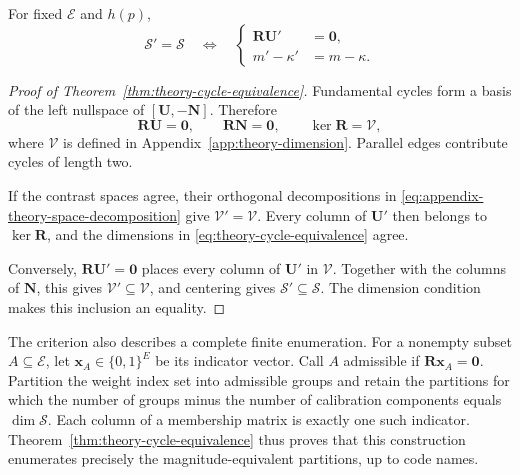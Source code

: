\begin{theorem}
    \label{thm:theory-cycle-equivalence}
    For fixed $\mathcal E$ and $h(p)$,
    \begin{equation}
        \mathcal S'=\mathcal S
        \quad\Longleftrightarrow\quad
        \left\{
        \begin{aligned}
            \mathbf R\mathbf U'&=\mathbf0,\\
            m'-\kappa'&=m-\kappa.
        \end{aligned}
        \right.
        \label{eq:theory-cycle-equivalence}
    \end{equation}
\end{theorem}

\begin{proof}[Proof of Theorem~\ref{thm:theory-cycle-equivalence}]
    Fundamental cycles form a basis of the left nullspace of
    $[\mathbf U,-\mathbf N]$. Therefore
    \begin{equation}
        \mathbf R\mathbf U=\mathbf0,
        \qquad
        \mathbf R\mathbf N=\mathbf0,
        \qquad
        \ker\mathbf R=\mathcal V,
        \label{eq:appendix-theory-cycle-kernel}
    \end{equation}
    where $\mathcal V$ is defined in
    Appendix~\ref{app:theory-dimension}.
    Parallel edges contribute cycles of length two.

    If the contrast spaces agree, their orthogonal decompositions
    in \eqref{eq:appendix-theory-space-decomposition} give
    $\mathcal V'=\mathcal V$.
    Every column of $\mathbf U'$ then belongs to
    $\ker\mathbf R$, and the dimensions in
    \eqref{eq:theory-cycle-equivalence} agree.

    Conversely, $\mathbf R\mathbf U'
    =\mathbf0$ places every column of $\mathbf U'$
    in $\mathcal V$.
    Together with the columns of $\mathbf N$, this gives
    $\mathcal V'\subseteq\mathcal V$,
    and centering gives
    $\mathcal S'\subseteq\mathcal S$.
    The dimension condition makes this inclusion an equality.
\end{proof}

The criterion also describes a complete finite enumeration.
For a nonempty subset $A\subseteq\mathcal E$, let
$\mathbf x_A\in\{0,1\}^E$ be its indicator vector.
Call $A$ admissible if $\mathbf R\mathbf x_A=\mathbf0$.
Partition the weight index set into admissible groups and retain the
partitions for which the number of groups minus the number of
calibration components equals $\dim\mathcal S$.
Each column of a membership matrix is exactly one such indicator.
Theorem~\ref{thm:theory-cycle-equivalence} thus proves that this
construction enumerates precisely the magnitude-equivalent
partitions, up to code names.


